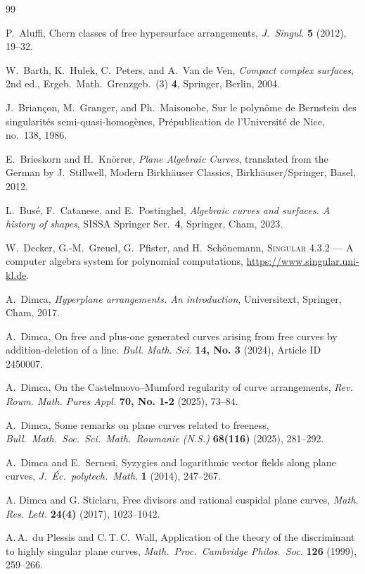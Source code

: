 \documentclass[11pt]{amsart}
\theoremstyle{definition}
\numberwithin{equation}{section}
\begin{document}
\begin{thebibliography}{99}

P.~Aluffi, Chern classes of free hypersurface arrangements, \emph{J.~Singul.} \textbf{5} (2012), 19--32.

W.~Barth, K.~Hulek, C.~Peters, and A.~Van de Ven, \emph{Compact complex surfaces}, 2nd ed., Ergeb.\ Math.\ Grenzgeb.\ (3) \textbf{4}, Springer, Berlin, 2004.

J.~Brian\c{c}on, M.~Granger, and Ph.~Maisonobe, Sur le polyn\^ome de Bernstein des singularit\'es semi-quasi-homog\`enes, Pr\'epublication de l'Universit\'e de Nice, no.~138, 1986.

E.~Brieskorn and H.~Kn\"orrer, \emph{Plane Algebraic Curves}, translated from the German by J.~Stillwell,
Modern Birkh\"auser Classics, Birkh\"auser/Springer, Basel, 2012.

L.~Bus\'e, F.~Catanese, and E.~Postinghel, \emph{Algebraic curves and surfaces. A history of shapes}, SISSA Springer Ser.\ \textbf{4}, Springer, Cham, 2023.

W.~Decker, G.-M.~Greuel, G.~Pfister, and H.~Sch\"onemann, \textsc{Singular} 4.3.2 --- A computer algebra system for polynomial computations, \url{https://www.singular.uni-kl.de}.

A.~Dimca, \emph{Hyperplane arrangements. An introduction}, Universitext, Springer, Cham, 2017.

A.~Dimca, On free and plus-one generated curves arising from free curves by addition-deletion of a line. \textit{Bull. Math. Sci.} \textbf{14, No. 3} (2024), Article ID 2450007.

A.~Dimca, On the Castelnuovo--Mumford regularity of curve arrangements,
\textit{Rev. Roum. Math. Pures Appl.} \textbf{70, No. 1-2} (2025), 73--84.

A.~Dimca, Some remarks on plane curves related to freeness, \emph{Bull.\ Math.\ Soc.\ Sci.\ Math.\ Roumanie (N.S.)} \textbf{68(116)} (2025), 281--292.

A.~Dimca and E.~Sernesi, Syzygies and logarithmic vector fields along plane curves, \emph{J.~\'Ec.\ polytech.\ Math.} \textbf{1} (2014), 247--267.

A. Dimca and G. Sticlaru, Free divisors and rational cuspidal plane curves, \textit{Math. Res. Lett.} \textbf{24(4)} (2017), 1023--1042.

A.\,A.~du Plessis and C.\,T.\,C.~Wall, Application of the theory of the discriminant to highly singular plane curves, \emph{Math.\ Proc.\ Cambridge Philos.\ Soc.} \textbf{126} (1999), 259--266.


\end{thebibliography}
\end{document}
